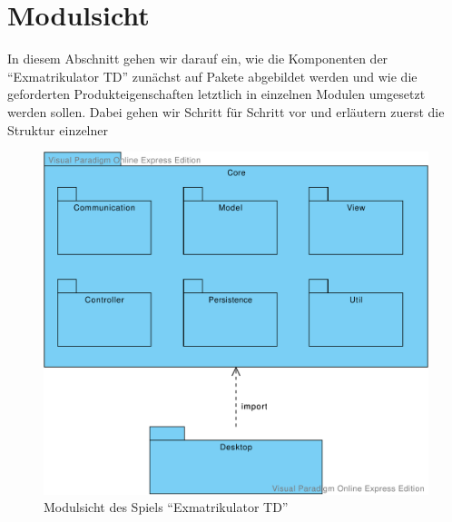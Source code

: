 \documentclass[enabledeprecatedfontcommands,fontsize=12pt,paper=a4,twoside,parskip=half]{scrartcl}
\begin{document}

\clearpage


\section{Modulsicht}

\label{sec:modulsicht}

In diesem Abschnitt gehen wir darauf ein, wie die Komponenten der \enquote{Exmatrikulator TD} zunächst auf Pakete abgebildet werden und wie die geforderten Produkteigenschaften letztlich in einzelnen Modulen umgesetzt werden sollen. Dabei gehen wir Schritt für Schritt vor und erläutern zuerst die Struktur einzelner 

\begin{figure}[H]
    \centering
    \includegraphics[width=\textwidth]{Bilder/Modulsicht.pdf}
    \caption{Modulsicht des Spiels \enquote{Exmatrikulator TD}}
    \label{fig:Paketdiagramm}
\end{figure}
\end{document}
